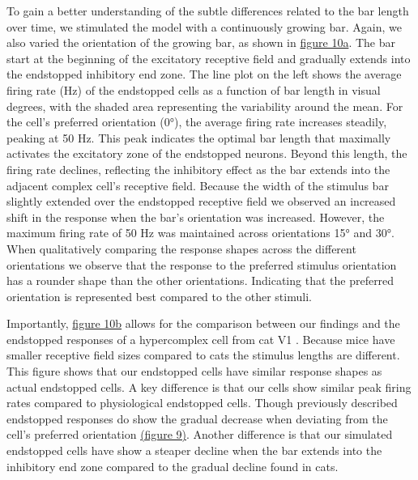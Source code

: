 \documentclass[12pt]{article}
\begin{document}
To gain a better understanding of the subtle differences related to the bar length over time, we stimulated the model with a continuously growing bar. Again, we also varied the orientation of the growing bar, as shown in \hyperref[fig:endstopping_length]{figure 10a}. The bar start at the beginning of the excitatory receptive field and gradually extends into the endstopped inhibitory end zone. The line plot on the left shows the average firing rate (Hz) of the endstopped cells as a function of bar length in visual degrees, with the shaded area representing the variability around the mean. For the cell's preferred orientation (0°), the average firing rate increases steadily, peaking at 50 Hz. This peak indicates the optimal bar length that maximally activates the excitatory zone of the endstopped neurons. Beyond this length, the firing rate declines, reflecting the inhibitory effect as the bar extends into the adjacent complex cell's receptive field. Because the width of the stimulus bar slightly extended over the endstopped receptive field we observed an increased shift in the response when the bar's orientation was increased. However, the maximum firing rate of 50 Hz was maintained across orientations 15° and 30°. When qualitatively comparing the response shapes across the different orientations we observe that the response to the preferred stimulus orientation has a rounder shape than the other orientations. Indicating that the preferred orientation is represented best compared to the other stimuli.  

Importantly, \hyperref[fig:endstopping_length]{figure 10b} allows for the comparison between our findings and the endstopped responses of a hypercomplex cell from cat V1 \autocite{orbanDimensionsPropertiesEndzone1979}. Because mice have smaller receptive field sizes compared to cats the stimulus lengths are different. This figure shows that our endstopped cells have similar response shapes as actual endstopped cells. A key difference is that our cells show similar peak firing rates compared to physiological endstopped cells. Though previously described endstopped responses do show the gradual decrease when deviating from the cell's preferred orientation \hyperref[fig:endstopping]{(figure 9)}. Another difference is that our simulated endstopped cells have show a steaper decline when the bar extends into the inhibitory end zone compared to the gradual decline found in cats. 
\end{document}
